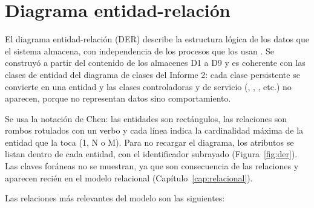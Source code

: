 \clearpage
\section{Diagrama entidad-relación}
\label{sec:der}

El diagrama entidad-relación (DER) describe la estructura lógica de los datos que el sistema
almacena, con independencia de los procesos que los usan \parencite{chen1976}. Se construyó a
partir del contenido de los almacenes D1 a D9 y es coherente con las clases de entidad del
diagrama de clases del Informe 2: cada clase persistente se convierte en una entidad y las
clases controladoras y de servicio (, ,
, etc.) no aparecen, porque no representan datos sino
comportamiento.

Se usa la notación de Chen: las entidades son rectángulos, las relaciones son rombos
rotulados con un verbo y cada línea indica la cardinalidad máxima de la entidad que la toca
(1, N o M). Para no recargar el diagrama, los atributos se listan dentro de cada entidad, con
el identificador subrayado (Figura~\ref{fig:der}). Las claves foráneas no se muestran, ya que
son consecuencia de las relaciones y aparecen recién en el modelo relacional
(Capítulo~\ref{cap:relacional}).

Las relaciones más relevantes del modelo son las siguientes:

